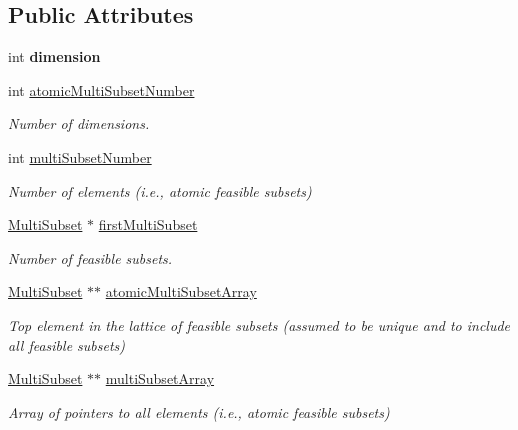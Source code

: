 \subsection*{Public Attributes}
\begin{DoxyCompactItemize}
\item 
\hypertarget{classMultiSet_a1a49a7a8c3d0db003198312c3bd541af}{int {\bfseries dimension}}\label{classMultiSet_a1a49a7a8c3d0db003198312c3bd541af}

\item 
\hypertarget{classMultiSet_a3084e5afaa18d1f19a38f7139f827cfc}{int \hyperlink{classMultiSet_a3084e5afaa18d1f19a38f7139f827cfc}{atomic\-Multi\-Subset\-Number}}\label{classMultiSet_a3084e5afaa18d1f19a38f7139f827cfc}

\begin{DoxyCompactList}\small\item\em Number of dimensions. \end{DoxyCompactList}\item 
\hypertarget{classMultiSet_a9c0c781a33f40bb2cd28110805572b7a}{int \hyperlink{classMultiSet_a9c0c781a33f40bb2cd28110805572b7a}{multi\-Subset\-Number}}\label{classMultiSet_a9c0c781a33f40bb2cd28110805572b7a}

\begin{DoxyCompactList}\small\item\em Number of elements (i.\-e., atomic feasible subsets) \end{DoxyCompactList}\item 
\hypertarget{classMultiSet_a18ee544d9b59a83e08eb8143432644ac}{\hyperlink{classMultiSubset}{Multi\-Subset} $\ast$ \hyperlink{classMultiSet_a18ee544d9b59a83e08eb8143432644ac}{first\-Multi\-Subset}}\label{classMultiSet_a18ee544d9b59a83e08eb8143432644ac}

\begin{DoxyCompactList}\small\item\em Number of feasible subsets. \end{DoxyCompactList}\item 
\hypertarget{classMultiSet_a75fc7f1d1ee81e81456df4158c1c0a28}{\hyperlink{classMultiSubset}{Multi\-Subset} $\ast$$\ast$ \hyperlink{classMultiSet_a75fc7f1d1ee81e81456df4158c1c0a28}{atomic\-Multi\-Subset\-Array}}\label{classMultiSet_a75fc7f1d1ee81e81456df4158c1c0a28}

\begin{DoxyCompactList}\small\item\em Top element in the lattice of feasible subsets (assumed to be unique and to include all feasible subsets) \end{DoxyCompactList}\item 
\hypertarget{classMultiSet_ab842b49495968659d979987e2d3285ef}{\hyperlink{classMultiSubset}{Multi\-Subset} $\ast$$\ast$ \hyperlink{classMultiSet_ab842b49495968659d979987e2d3285ef}{multi\-Subset\-Array}}\label{classMultiSet_ab842b49495968659d979987e2d3285ef}

\begin{DoxyCompactList}\small\item\em Array of pointers to all elements (i.\-e., atomic feasible subsets) \end{DoxyCompactList}\end{DoxyCompactItemize}
